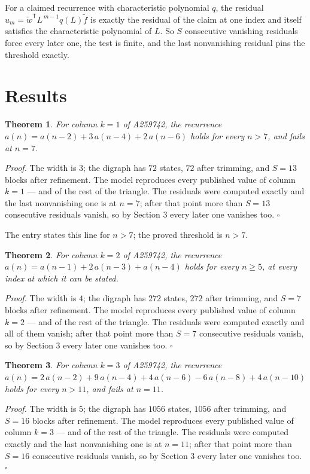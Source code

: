\documentclass[11pt]{article}
\newtheorem{theorem}{Theorem}
\theoremstyle{definition}
\begin{document}
For a claimed recurrence with characteristic polynomial $q$, the residual $u_m = \tilde w^{\mathsf T}L^{\,m-1}q(L)\tilde f$ is exactly the residual of the claim at one index and itself satisfies the characteristic polynomial of $L$. So $S$ consecutive vanishing residuals force every later one, the test is finite, and the last nonvanishing residual pins the threshold exactly.

\section{Results}

\begin{theorem} For column $k = 1$ of A259742, the recurrence $a(n) = a(n-2) + 3\,a(n-4) + 2\,a(n-6)$ holds for every $n > 7$, and fails at $n = 7$.\end{theorem}

{\itshape Proof.} The width is $3$; the digraph has $72$ states, $72$ after trimming, and $S = 13$ blocks after refinement. The model reproduces every published value of column $k = 1$ --- and of the rest of the triangle. The residuals were computed exactly and the last nonvanishing one is at $n = 7$; after that point more than $S = 13$ consecutive residuals vanish, so by Section 3 every later one vanishes too. $\square$

The entry states this line for $n > 7$; the proved threshold is $n > 7$.

\begin{theorem} For column $k = 2$ of A259742, the recurrence $a(n) = a(n-1) + 2\,a(n-3) + a(n-4)$ holds for every $n \ge 5$, at every index at which it can be stated.\end{theorem}

{\itshape Proof.} The width is $4$; the digraph has $272$ states, $272$ after trimming, and $S = 7$ blocks after refinement. The model reproduces every published value of column $k = 2$ --- and of the rest of the triangle. The residuals were computed exactly and all of them vanish; after that point more than $S = 7$ consecutive residuals vanish, so by Section 3 every later one vanishes too. $\square$

\begin{theorem} For column $k = 3$ of A259742, the recurrence $a(n) = 2\,a(n-2) + 9\,a(n-4) + 4\,a(n-6) - 6\,a(n-8) + 4\,a(n-10)$ holds for every $n > 11$, and fails at $n = 11$.\end{theorem}

{\itshape Proof.} The width is $5$; the digraph has $1056$ states, $1056$ after trimming, and $S = 16$ blocks after refinement. The model reproduces every published value of column $k = 3$ --- and of the rest of the triangle. The residuals were computed exactly and the last nonvanishing one is at $n = 11$; after that point more than $S = 16$ consecutive residuals vanish, so by Section 3 every later one vanishes too. $\square$
\end{document}
